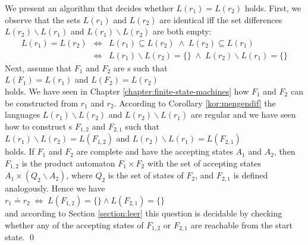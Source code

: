 \proofEng
We present an algorithm that decides whether $L(r_1) = L(r_2)$ holds.  First, we observe that the sets
$L(r_1)$ and $L(r_2)$ are identical iff the set differences $L(r_2) \backslash L(r_1)$ and $L(r_1) \backslash L(r_2)$
are both empty:
\begin{eqnarray*}
                  L(r_1) = L(r_2) 
&\Leftrightarrow& L(r_1) \subseteq L(r_2)         \;\wedge\; L(r_2) \subseteq L(r_1)          \\
&\Leftrightarrow& L(r_1) \backslash L(r_2) = \{\} \;\wedge\; L(r_2) \backslash L(r_1) = \{\}  
\end{eqnarray*}
Next, assume that $F_1$ and $F_2$ are  s such that
\\[0.2cm]
\hspace*{1.3cm}
$L(F_1) = L(r_1)$ \quad and \quad $L(F_2) = L(r_2)$
\\[0.2cm]
holds.  We have seen in Chapter \ref{chapter:finite-state-machines} how $F_1$ and $F_2$ can be
constructed from $r_1$ and $r_2$. According to Corollary \ref{kor:mengendif} the languages
$L(r_1) \backslash L(r_2)$ and $L(r_2) \backslash L(r_1)$ are regular and we have seen how to
construct s $F_{1,2}$ and $F_{2,1}$ such that
\\[0.2cm]
\hspace*{1.3cm}
$L(r_1) \backslash L(r_2) = L(F_{1,2})$ \quad and \quad $L(r_2) \backslash L(r_1) = L(F_{2,1})$
\\[0.2cm]
holds.  If $F_1$ and $F_2$ are complete and have the accepting states $A_1$ and $A_2$, then
$F_{1,2}$ is the product automaton $F_1 \times F_2$ with the set of accepting states
$A_1 \times (Q_2 \backslash A_2)$, where $Q_2$ is the set of states of $F_2$, and $F_{2,1}$ is
defined analogously.  Hence we have
\\[0.2cm]
\hspace*{1.3cm}
$r_1 \doteq r_2 \;\Leftrightarrow\; L(F_{1,2}) = \{\} \wedge  L(F_{2,1}) = \{\}$
\\[0.2cm]
and according to Section \ref{section:leer} this question is decidable by checking whether any of
the accepting states of $F_{1,2}$ or $F_{2,1}$ are reachable from the start state.
\qed

